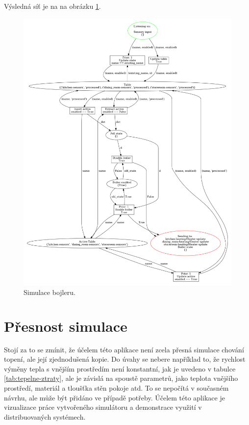 Výsledná síť je na na obrázku \ref{boiler-logic-viz}.

\begin{figure}[httb]
 \centering
 \includegraphics[width=\textwidth]{obrazky-figures/boiler-logic.png}
 \caption{Simulace bojleru.}
 \label{boiler-logic-viz}
\end{figure}

\section{Přesnost simulace}

Stojí za to se zmínit, že účelem této aplikace není zcela přesná simulace chování topení, ale její zjednodušená kopie. Do úvahy se nebere například to, že rychlost výměny tepla s vnějším prostředím není konstantní, jak je uvedeno v tabulce \ref{tab:tepelne-ztraty}, ale je závislá na spoustě parametrů, jako teplota vnějšího prostředí, materiál a tloušťka stěn pokoje atd. To se nepočítá v současném návrhu, ale může být přidáno ve případě potřeby. Účelem této aplikace je vizualizace práce vytvořeného simulátoru a demonstrace využití v distribuovaných systémech.

